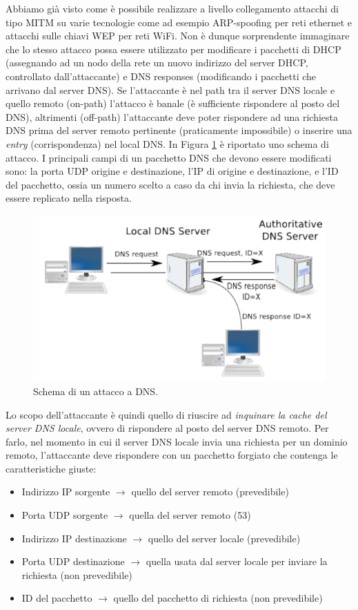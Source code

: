 Abbiamo già visto come è possibile realizzare a livello collegamento attacchi di tipo MITM su varie tecnologie come ad esempio ARP-spoofing per reti ethernet e attacchi sulle chiavi WEP per reti WiFi. Non è dunque sorprendente  immaginare che lo stesso attacco possa essere utilizzato per modificare i pacchetti di DHCP (assegnando ad un nodo della rete un nuovo indirizzo del server DHCP, controllato dall'attaccante) e DNS responses (modificando i pacchetti che arrivano dal server DNS). Se l'attaccante è nel path tra il server DNS locale e quello remoto (on-path) l'attacco è banale (è sufficiente rispondere al posto del DNS), altrimenti (off-path) l'attaccante deve poter rispondere ad una richiesta DNS prima del server remoto pertinente (praticamente impossibile) o inserire una \textit{entry} (corrispondenza) nel local DNS. In Figura \ref{img:DNS-attack} è riportato uno schema di attacco. I principali campi di un pacchetto DNS che devono essere modificati sono: la porta UDP origine e destinazione, l'IP di origine e destinazione, e l'ID del pacchetto, ossia un numero scelto a caso da chi invia la richiesta, che deve essere replicato nella risposta.
\begin{figure}[htbp]
	\centering
	\includegraphics[scale = 0.5]{images/DNS-attack}
	\caption{Schema di un attacco a DNS.}
	\label{img:DNS-attack}
\end{figure}
\noindent
Lo scopo dell'attaccante è quindi quello di riuscire ad \textit{inquinare la cache del server DNS locale}, ovvero di rispondere al posto del server DNS remoto. Per farlo, nel momento in cui il server DNS locale invia una richiesta per un dominio remoto, l'attaccante deve rispondere con un pacchetto forgiato che contenga le caratteristiche giuste:
\begin{itemize}
	\item Indirizzo IP sorgente $\longrightarrow$ quello del server remoto (prevedibile)
	\item Porta UDP sorgente $\longrightarrow$ quella del server remoto (53)
	\item Indirizzo IP destinazione $\longrightarrow$ quello del server locale (prevedibile)
	\item Porta UDP destinazione $\longrightarrow$ quella usata dal server locale per inviare la richiesta (non prevedibile)
	\item ID del pacchetto $\longrightarrow$ quello del pacchetto di richiesta (non prevedibile)
\end{itemize}
